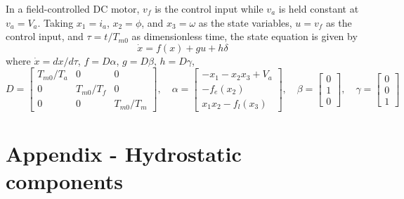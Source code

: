 \documentclass[12pt,a4paper,oneside]{book}
\begin{document}
\begin{onehalfspace}
In a field-controlled DC motor, $v_f$ is the control input while $v_a$ is held constant at $v_a=V_a$. Taking $x_1=i_a$, $x_2=\phi$, and $x_3=\omega$ as the state variables, $u=v_f$ as the control input, and $\tau=t/T_{m0}$ as dimensionless time, the state equation is given by
\begin{equation}
	\dot{x}=f(x)+gu+h\delta
\end{equation}
where $\dot{x}=dx/d\tau$, $f=D\alpha$, $g=D\beta$, $h=D\gamma$,
\begin{equation*}
	D=\begin{bmatrix} T_{m0}/T_a & 0 & 0 \\[6pt] 0 & T_{m0}/T_f & 0 \\[6pt] 0 & 0 & T_{m0}/T_m \end{bmatrix},\quad
	\alpha=\begin{bmatrix} -x_1-x_2x_3+V_a \\[6pt] -f_e(x_2) \\[6pt] x_1x_2-f_l(x_3)\end{bmatrix},\quad
	\beta=\begin{bmatrix} 0 \\[6pt] 1 \\[6pt] 0\end{bmatrix},\quad
	\gamma=\begin{bmatrix} 0 \\[6pt] 0 \\[6pt] 1\end{bmatrix}
\end{equation*}






\chapter{Appendix - Hydrostatic components}

\end{onehalfspace}
\end{document}
